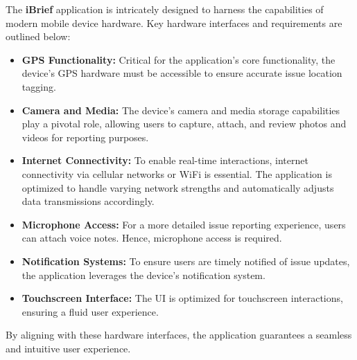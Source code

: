 The \textbf{iBrief} application is intricately designed to harness the capabilities of modern mobile device hardware. Key hardware interfaces and requirements are outlined below:

\begin{itemize}
    \item \textbf{GPS Functionality:} Critical for the application's core functionality, the device's GPS hardware must be accessible to ensure accurate issue location tagging.
    
    \item \textbf{Camera and Media:} The device's camera and media storage capabilities play a pivotal role, allowing users to capture, attach, and review photos and videos for reporting purposes.
    
    \item \textbf{Internet Connectivity:} To enable real-time interactions, internet connectivity via cellular networks or WiFi is essential. The application is optimized to handle varying network strengths and automatically adjusts data transmissions accordingly.
    
    \item \textbf{Microphone Access:} For a more detailed issue reporting experience, users can attach voice notes. Hence, microphone access is required.
    
    \item \textbf{Notification Systems:} To ensure users are timely notified of issue updates, the application leverages the device's notification system.
    
    \item \textbf{Touchscreen Interface:} The UI is optimized for touchscreen interactions, ensuring a fluid user experience.
\end{itemize}

By aligning with these hardware interfaces, the application guarantees a seamless and intuitive user experience.

